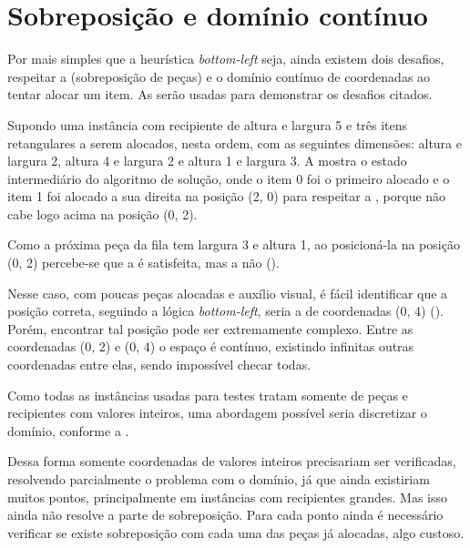 \section{Sobreposição e domínio contínuo}\label{sec:sobreposicao-e-dominio-infinito}

Por mais simples que a heurística \textit{bottom-left} seja, ainda existem dois desafios,
respeitar a  (sobreposição de peças) e o domínio contínuo de coordenadas
ao tentar alocar um item.
As  serão usadas para
demonstrar os desafios citados.

Supondo uma instância com recipiente de altura e largura 5 e três itens retangulares a serem
alocados, nesta ordem, com as seguintes dimensões: altura e largura 2, altura 4 e largura 2 e
altura 1 e largura 3.
A  mostra o estado intermediário do algoritmo de solução, onde o
item 0 foi o primeiro alocado e o item 1 foi alocado a sua direita na posição (2, 0) para respeitar
a , porque não cabe logo acima na posição (0, 2).




Como a próxima peça da fila tem largura 3 e altura 1, ao posicioná-la na posição (0, 2)
percebe-se que a  é satisfeita, mas a  não ().



Nesse caso, com poucas peças alocadas e auxílio visual, é fácil identificar que a posição correta,
seguindo a lógica \textit{bottom-left}, seria a de coordenadas (0, 4)
().
Porém, encontrar tal posição pode ser extremamente complexo.
Entre as coordenadas (0, 2) e (0, 4) o espaço é contínuo, existindo infinitas outras coordenadas
entre elas, sendo impossível checar todas.



Como todas as instâncias usadas para testes tratam somente de peças e recipientes com valores
inteiros, uma abordagem possível seria discretizar o domínio, conforme a
.



Dessa forma somente coordenadas de valores inteiros precisariam ser verificadas, resolvendo
parcialmente o problema com o domínio, já que ainda existiriam muitos pontos, principalmente em
instâncias com recipientes grandes.
Mas isso ainda não resolve a parte de sobreposição.
Para cada ponto ainda é necessário verificar se existe sobreposição com cada uma das peças já
alocadas, algo custoso.


